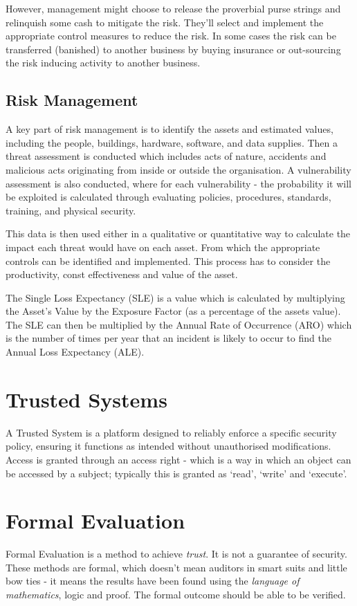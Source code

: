 However, management might choose to release the proverbial purse strings and relinquish some cash to mitigate the risk. They'll select and implement the appropriate control measures to reduce the risk. In some cases the risk can be transferred (banished) to another business by buying insurance or out-sourcing the risk inducing activity to another business.

\subsection{Risk Management}
A key part of risk management is to identify the assets and estimated values, including the people, buildings, hardware, software, and data supplies. Then a threat assessment is conducted which includes acts of nature, accidents and malicious acts originating from inside or outside the organisation. A vulnerability assessment is also conducted, where for each vulnerability - the probability it will be exploited is calculated through evaluating policies, procedures, standards, training, and physical security.

This data is then used either in a qualitative or quantitative way to calculate the impact each threat would have on each asset. From which the appropriate controls can be identified and implemented. This process has to consider the productivity, const effectiveness and value of the asset.

The Single Loss Expectancy (SLE) is a value which is calculated by multiplying the Asset's Value by the Exposure Factor (as a percentage of the assets value). The SLE can then be multiplied by the Annual Rate of Occurrence (ARO) which is the number of times per year that an incident is likely to occur to find the Annual Loss Expectancy (ALE). 

\section{Trusted Systems}
A Trusted System is a platform designed to reliably enforce a specific security policy, ensuring it functions as intended without unauthorised modifications. Access is granted through an access right - which is a way in which an object can be accessed by a subject; typically this is granted as `read', `write' and `execute'. 

\section{Formal Evaluation}
Formal Evaluation is a method to achieve \textit{trust}. It is not a guarantee of security. These methods are formal, which doesn't mean auditors in smart suits and little bow ties - it means the results have been found using the \textit{language of mathematics}, logic and proof. The formal outcome should be able to be verified. 

